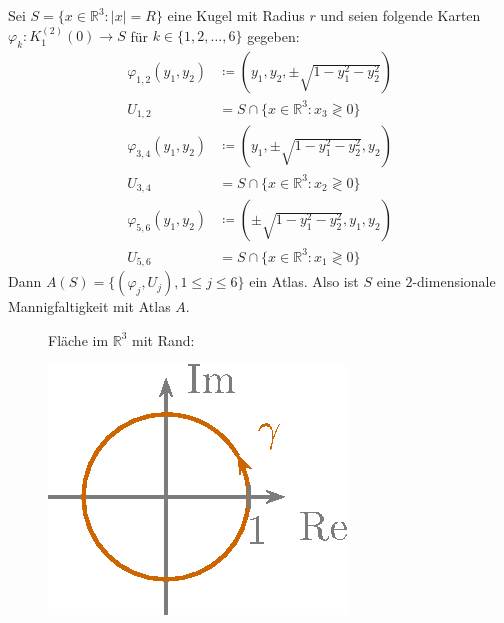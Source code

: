 \documentclass[a4paper,10pt]{scrbook}
\begin{document}
\begin{example} \label{thm:9.3}
  Sei $S = \{ x \in \mathbb{R}^3 : |x| = R \}$ eine Kugel mit Radius $r$ und seien folgende Karten $\varphi_k : K_1^{(2)}(0) \to S$ für $k \in \{1,2,\dotsc,6\}$ gegeben:
  \begin{align*}
    \varphi_{1,2}(y_1,y_2) &\coloneq \left( y_1,y_2,\pm \sqrt{1-y_1^2-y_2^2} \right) \\
    U_{1,2} &= S \cap \{ x \in \mathbb{R}^3 : x_3 \gtrless 0 \} \\
    \varphi_{3,4}(y_1,y_2) &\coloneq \left( y_1,\pm \sqrt{1-y_1^2-y_2^2},y_2 \right) \\
    U_{3,4} &= S \cap \{ x \in \mathbb{R}^3 : x_2 \gtrless 0 \} \\
    \varphi_{5,6}(y_1,y_2) &\coloneq \left( \pm \sqrt{1-y_1^2-y_2^2},y_1,y_2 \right) \\
    U_{5,6} &= S \cap \{ x \in \mathbb{R}^3 : x_1 \gtrless 0 \}
  \end{align*}
  Dann $A(S) = \{ (\varphi_j,U_j) , 1 \leq j \leq 6 \}$ ein Atlas. Also ist $S$ eine $2$-dimensionale Mannigfaltigkeit mit Atlas $A$.
\end{example}

\begin{figure}[H]
  Fläche im $\mathbb{R}^3$ mit Rand:

  \centering
  \includegraphics[scale=0.2]{images/ana3-tmp-73}
\end{figure}
\end{document}
